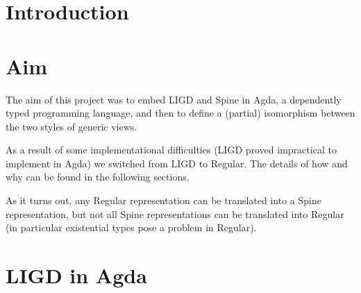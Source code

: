 \documentclass[a4paper]{article}
\begin{document}
\maketitle

\begin{abstract}
    
\end{abstract}

\section{Introduction}


\section{Aim}

The aim of this project was to embed LIGD and Spine in Agda, a dependently typed programming language,
and then to define a (partial) isomorphism between the two styles of generic views.

As a result of some implementational difficulties (LIGD proved impractical to implement in Agda) we switched from
LIGD to Regular. The details of how and why can be found in the following sections.

As it turns out, any Regular representation can be translated into a Spine representation, but not all Spine representations
can be translated into Regular (in particular existential types pose a problem in Regular).

\section{LIGD in Agda}
\end{document}
